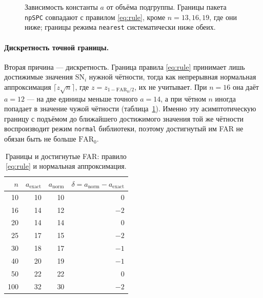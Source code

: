 \documentclass[11pt,a4paper]{article}
\newcommand{\SN}{\mathrm{SN}}
\def\verACons{(1,1.000000) (2,2.000000) (3,3.000000) (4,4.000000) (5,5.000000) (6,6.000000) (7,7.000000) (8,8.000000) (9,9.000000) (10,10.000000) (11,11.000000) (12,12.000000) (13,13.000000) (14,12.000000) (15,13.000000) (16,14.000000) (17,13.000000) (18,14.000000) (19,15.000000) (20,14.000000)}
\def\verANp{(1,1.000000) (2,2.000000) (3,3.000000) (4,4.000000) (5,5.000000) (6,6.000000) (7,7.000000) (8,8.000000) (9,9.000000) (10,10.000000) (11,11.000000) (12,12.000000) (13,11.000000) (14,12.000000) (15,13.000000) (16,12.000000) (17,13.000000) (18,14.000000) (19,13.000000) (20,14.000000)}
\def\verANear{(1,1.000000) (2,1.000000) (3,2.000000) (4,3.000000) (5,4.000000) (6,5.000000) (7,6.000000) (8,5.000000) (9,6.000000) (10,7.000000) (11,6.000000) (12,7.000000) (13,8.000000) (14,7.000000) (15,8.000000) (16,7.000000) (17,8.000000) (18,9.000000) (19,8.000000) (20,9.000000)}
\begin{document}
\begin{figure}[htbp]\centering
{}
\caption{Зависимость константы $a$ от объёма подгруппы. Границы пакета
\texttt{npSPC} совпадают с правилом \eqref{eq:rule}, кроме $n=13,16,19$, где
они ниже; границы режима \texttt{nearest} систематически ниже обеих.}
\label{fig:limits}
\end{figure}

\paragraph{Дискретность точной границы.}
Вторая причина --- дискретность. Граница правила \eqref{eq:rule} принимает
лишь достижимые значения $\SN_i$ нужной чётности, тогда как непрерывная
нормальная аппроксимация $\lceil z\sqrt{n}\rceil$, где
$z=z_{1-\mathrm{FAR}_0/2}$, их не учитывает. При $n=16$ она даёт $a=12$ ---
на две единицы меньше точного $a=14$, а при чётном $n$ иногда попадает в
значение чужой чётности (таблица~\ref{tab:norm}). Именно эту асимптотическую
границу с подъёмом до ближайшего достижимого значения той же чётности
воспроизводит режим \texttt{normal} библиотеки, поэтому достигнутый им FAR
не обязан быть не больше $\mathrm{FAR}_0$.

\begin{table}[htbp]\centering
\caption{Границы и достигнутые FAR: правило \eqref{eq:rule} и нормальная аппроксимация.}
\label{tab:norm}
\begin{tabular}{@{}r r r r@{}}
\toprule
$n$ & $a_{\mathrm{exact}}$ & $a_{\mathrm{norm}}$ & $\delta = a_{\mathrm{norm}} - a_{\mathrm{exact}}$ \\
\midrule
10  & 10 & 10 & 0 \\
16  & 14 & 12 & $-2$ \\
20  & 14 & 14 & 0 \\
25  & 17 & 15 & $-2$ \\
30  & 18 & 17 & $-1$ \\
40  & 20 & 19 & $-1$ \\
50  & 22 & 22 & 0 \\
100 & 32 & 30 & $-2$ \\
\bottomrule
\end{tabular}
\end{table}
\end{document}
